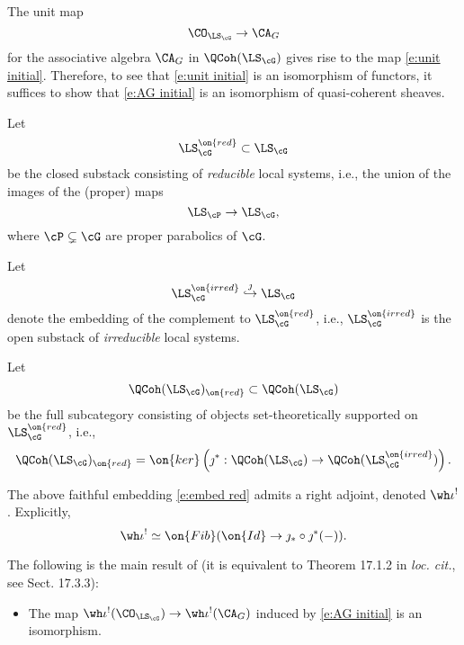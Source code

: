 \documentclass[9pt]{amsart}
\theoremstyle{remark}
\theoremstyle{definition}
\theoremstyle{remark}
\numberwithin{equation}{section}
\begin{document}
\sssec{}

The unit map
\begin{equation} \label{e:AG initial}
\CO_{\LS_\cG}\to \CA_G
\end{equation}
for the associative algebra $\CA_G$ in $\QCoh(\LS_\cG)$ 
gives rise to the map \eqref{e:unit initial}. 
Therefore, to see that \eqref{e:unit initial} is an isomorphism of functors, it suffices to show that 
\eqref{e:AG initial} is an isomorphism of quasi-coherent sheaves.


\sssec{}

Let
$$\LS^{\on{red}}_\cG \subset \LS_\cG$$
be the closed substack consisting of \emph{reducible} local systems, i.e., the union of the images of the
(proper) maps
$$\LS_\cP\to \LS_\cG,$$
where $\cP \subsetneq \cG$ are proper parabolics of $\cG$.

\medskip

Let
$$\LS_\cG^{\on{irred}}\overset{\jmath}\hookrightarrow \LS_\cG$$
denote the embedding of the complement to 
$\LS^{\on{red}}_\cG$, i.e., $\LS_\cG^{\on{irred}}$ is 
the open substack of \emph{irreducible} local systems. 

\sssec{}

Let
\begin{equation} \label{e:embed red}
\QCoh(\LS_\cG)_{\on{red}}\subset \QCoh(\LS_\cG)
\end{equation}
be the full subcategory consisting of objects set-theoretically supported on $\LS^{\on{red}}_\cG$, i.e.,
$$\QCoh(\LS_\cG)_{\on{red}}=\on{ker}\left(\jmath^*:\QCoh(\LS_\cG)\to \QCoh(\LS^{\on{irred}}_\cG)\right).$$

\medskip

The above faithful embedding \eqref{e:embed red} admits a right adjoint, denoted $\wh\iota^!$. Explicitly,
$$\wh\iota^!\simeq \on{Fib}(\on{Id}\to \jmath_*\circ \jmath^*(-)).$$

\sssec{}  \label{sss:on Eis}

The following is the main result of \cite{GLC3} (it is equivalent to Theorem 17.1.2 in {\it loc. cit.}, see Sect. 17.3.3):

\medskip

\begin{itemize}

\item The map $\wh\iota^!(\CO_{\LS_\cG})\to \wh\iota^!(\CA_G)$ induced by \eqref{e:AG initial} is an isomorphism.

\end{itemize}
\end{document}
